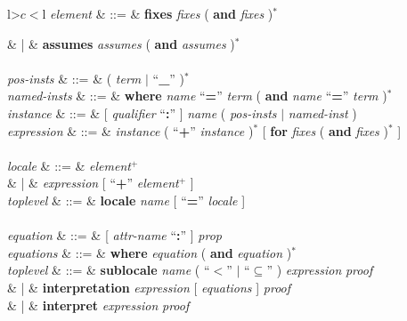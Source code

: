 \begin{isabellebody}
\begin{isamarkuptext}
\begin{table}
\begin{center}
\begin{tabular}{l>$c<$l}
  \textit{element} & ::=
  & \textbf{fixes} \textit{fixes} ( \textbf{and} \textit{fixes} )$^*$ \\
\begin{comment}
  & |
  & \textbf{constrains} \textit{constrains}
    ( \textbf{and} \textit{constrains} )$^*$ \\
\end{comment}
  & |
  & \textbf{assumes} \textit{assumes} ( \textbf{and} \textit{assumes} )$^*$ \\[2ex]

   \\

  \textit{pos-insts} & ::=
  & ( \textit{term} $|$ ``\textbf{\_}'' )$^*$ \\
  \textit{named-insts} & ::=
  & \textbf{where} \textit{name} ``\textbf{=}'' \textit{term}
  ( \textbf{and} \textit{name} ``\textbf{=}'' \textit{term} )$^*$ \\
  \textit{instance} & ::=
  & [ \textit{qualifier} ``\textbf{:}'' ]
    \textit{name} ( \textit{pos-insts} $|$ \textit{named-inst} ) \\
  \textit{expression}  & ::= 
  & \textit{instance} ( ``\textbf{+}'' \textit{instance} )$^*$
    [ \textbf{for} \textit{fixes} ( \textbf{and} \textit{fixes} )$^*$ ] \\[2ex]

   \\

  \textit{locale} & ::=
  & \textit{element}$^+$ \\
  & | & \textit{expression} [ ``\textbf{+}'' \textit{element}$^+$ ] \\
  \textit{toplevel} & ::=
  & \textbf{locale} \textit{name} [ ``\textbf{=}''
    \textit{locale} ] \\[2ex]

   \\

  \textit{equation} & ::= & [ \textit{attr-name} ``\textbf{:}'' ]
    \textit{prop} \\
  \textit{equations} & ::= &  \textbf{where} \textit{equation} ( \textbf{and}
    \textit{equation} )$^*$  \\
  \textit{toplevel} & ::=
  & \textbf{sublocale} \textit{name} ( ``$<$'' $|$
    ``$\subseteq$'' ) \textit{expression} \textit{proof} \\
  & |
  & \textbf{interpretation}
    \textit{expression} [ \textit{equations} ] \textit{proof} \\
  & |
  & \textbf{interpret}
    \textit{expression} \textit{proof} \\[2ex]


\end{tabular}
\end{center}
\end{table}
\end{isamarkuptext}
\end{isabellebody}
